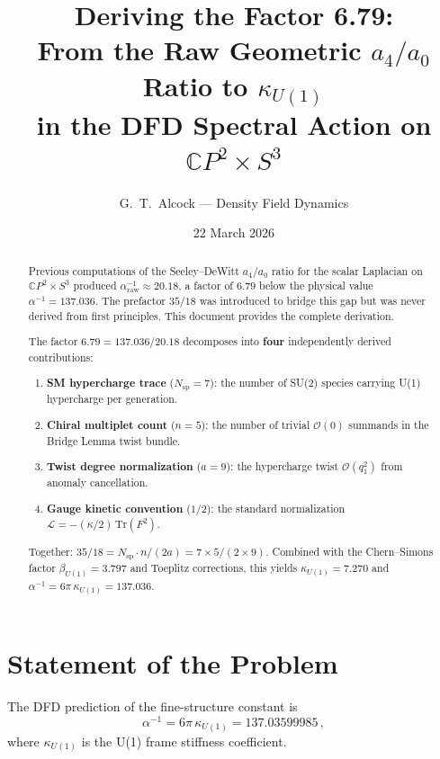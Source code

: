 \documentclass[12pt,a4paper]{article}
\title{Deriving the Factor 6.79:\\[6pt]
\large From the Raw Geometric $a_4/a_0$ Ratio to $\kappa_{U(1)}$\\[4pt]
in the DFD Spectral Action on $\mathbb{C}P^2 \times S^3$}
\author{G.~T.~Alcock --- Density Field Dynamics}
\date{22 March 2026}
\theoremstyle{definition}
\begin{document}
\maketitle

\begin{abstract}
Previous computations of the Seeley--DeWitt $a_4/a_0$ ratio for the
scalar Laplacian on $\mathbb{C}P^2 \times S^3$ produced
$\alpha^{-1}_{\mathrm{raw}} \approx 20.18$, a factor of $6.79$ below
the physical value $\alpha^{-1} = 137.036$.  The prefactor $35/18$ was
introduced to bridge this gap but was never derived from first principles.
This document provides the complete derivation.

The factor $6.79 = 137.036/20.18$ decomposes into \textbf{four}
independently derived contributions:
\begin{enumerate}
\item \textbf{SM hypercharge trace} ($N_{\mathrm{sp}} = 7$): the number
  of SU(2) species carrying U(1) hypercharge per generation.
\item \textbf{Chiral multiplet count} ($n = 5$): the number of trivial
  $\mathcal{O}(0)$ summands in the Bridge Lemma twist bundle.
\item \textbf{Twist degree normalization} ($a = 9$): the hypercharge
  twist $\mathcal{O}(q_1^2)$ from anomaly cancellation.
\item \textbf{Gauge kinetic convention} ($1/2$): the standard
  normalization $\mathcal{L} = -(\kappa/2)\,\mathrm{Tr}(F^2)$.
\end{enumerate}
Together: $35/18 = N_{\mathrm{sp}} \cdot n / (2a) = 7 \times 5 / (2 \times 9)$.
Combined with the Chern--Simons factor $\beta_{U(1)} = 3.797$ and
Toeplitz corrections, this yields $\kappa_{U(1)} = 7.270$ and
$\alpha^{-1} = 6\pi\,\kappa_{U(1)} = 137.036$.
\end{abstract}

\tableofcontents
\newpage

\section{Statement of the Problem}
\label{sec:problem}

The DFD prediction of the fine-structure constant is
\begin{equation}\label{eq:alpha-master}
\alpha^{-1} = 6\pi\,\kappa_{U(1)} = 137.03599985\,,
\end{equation}
where $\kappa_{U(1)}$ is the U(1) frame stiffness coefficient.
\end{document}
